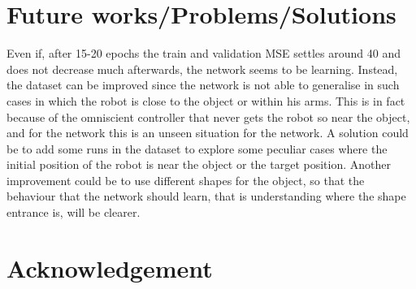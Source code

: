 \documentclass[conference]{IEEEtran}
\begin{document}
\section{Future works/Problems/Solutions}
Even if, after 15-20 epochs the train and validation MSE settles around 40 and does not decrease much afterwards, the 
network seems to be learning. Instead, the dataset can be improved since the network is not able to generalise in such 
cases in which the robot is close to the object or within his arms. This is in fact because of the omniscient 
controller that never gets the robot so near the object, and for the network this is an unseen situation for the 
network.
A solution could be to add some runs in the dataset to explore some peculiar cases where the initial position of the 
robot is near the object or the target position.
Another improvement could be to use different shapes for the object, so that the behaviour that the network should 
learn, that is understanding where the shape entrance is, will be clearer.
%
%
%
%
%
%
%


\section*{Acknowledgement}




\end{document}
